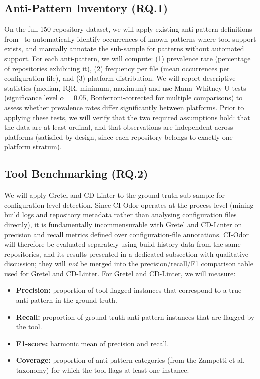\documentclass[12pt, a4paper]{article}
\begin{document}
\subsection{Anti-Pattern Inventory (RQ.1)}

On the full 150-repository dataset, we will apply existing anti-pattern definitions
from~\cite{gallaba2020, vassallo2020b, zampetti2020} to automatically identify
occurrences of known patterns where tool support exists, and manually annotate the
sub-sample for patterns without automated support. For each anti-pattern, we will
compute: (1) prevalence rate (percentage of repositories exhibiting it), (2) frequency
per file (mean occurrences per configuration file), and (3) platform distribution. We
will report descriptive statistics (median, IQR, minimum, maximum) and use
Mann--Whitney U tests (significance level $\alpha = 0.05$, Bonferroni-corrected for
multiple comparisons) to assess whether prevalence rates differ significantly between
platforms. Prior to applying these tests, we will verify that the two required
assumptions hold: that the data are at least ordinal, and that observations are
independent across platforms (satisfied by design, since each repository belongs to
exactly one platform stratum).

\subsection{Tool Benchmarking (RQ.2)}

We will apply Gretel and CD-Linter to the ground-truth sub-sample for
configuration-level detection. Since CI-Odor operates at the process level (mining
build logs and repository metadata rather than analysing configuration files directly),
it is fundamentally incommensurable with Gretel and CD-Linter on precision and recall
metrics defined over configuration-file annotations. CI-Odor will therefore be
evaluated separately using build history data from the same repositories, and its
results presented in a dedicated subsection with qualitative discussion; they will
\emph{not} be merged into the precision/recall/F1 comparison table used for Gretel
and CD-Linter. For Gretel and CD-Linter, we will measure:

\begin{itemize}
    \item \textbf{Precision:} proportion of tool-flagged instances that correspond to
          a true anti-pattern in the ground truth.

    \item \textbf{Recall:} proportion of ground-truth anti-pattern instances that are
          flagged by the tool.

    \item \textbf{F1-score:} harmonic mean of precision and recall.

    \item \textbf{Coverage:} proportion of anti-pattern categories (from the Zampetti
          et al.~\cite{zampetti2020} taxonomy) for which the tool flags at least one
          instance.
\end{itemize}
\end{document}
